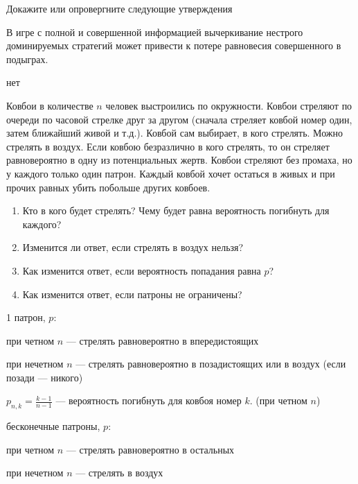 \begin{problem}
Докажите или опровергните следующие утверждения\par
 В игре с полной и совершенной информацией вычеркивание нестрого доминируемых стратегий может привести к потере равновесия совершенного в подыграх.
\begin{sol}
нет
\end{sol}
\end{problem}



\begin{problem}[Ковбои]
Ковбои в количестве $n$ человек выстроились по окружности. Ковбои стреляют по очереди по часовой стрелке друг за другом (сначала стреляет ковбой номер один, затем ближайший живой и т.д.). Ковбой сам выбирает, в кого стрелять. Можно стрелять в воздух. Если ковбою безразлично в кого стрелять, то он стреляет равновероятно в одну из потенциальных жертв. Ковбои стреляют без промаха, но у каждого только один патрон. Каждый ковбой хочет остаться в живых и при прочих равных убить побольше других ковбоев.\par
\begin{enumerate}
\item  Кто в кого будет стрелять? Чему будет равна вероятность погибнуть для каждого? \par
\item Изменится ли ответ, если стрелять в воздух нельзя? \par
\item  Как изменится ответ, если вероятность попадания равна $p$? \par
\item Как изменится ответ, если патроны не ограничены?
\end{enumerate}


\begin{sol}
1 патрон, $p$: \par
при четном $n$ --- стрелять равновероятно в впередистоящих \par
при нечетном $n$ --- стрелять равновероятно в позадистоящих или в воздух (если позади --- никого) \par
$p_{n,k}=\frac{k-1}{n-1}$ --- вероятность погибнуть для ковбоя номер $k$. (при четном $n$) \par
бесконечные патроны, $p$: \par
при четном $n$ --- стрелять равновероятно в остальных \par
при нечетном $n$ --- стрелять в воздух
\end{sol}
\end{problem}



